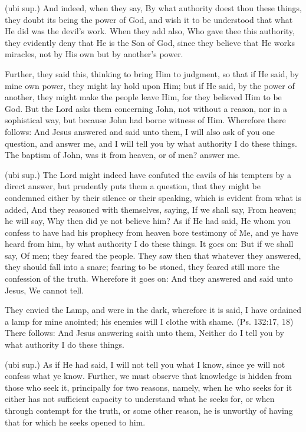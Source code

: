  (ubi sup.) And indeed, when they say, By what authority doest thou these things, they doubt its being the power of God, and wish it to be understood that what He did was the devil’s work. When they add also, Who gave thee this authority, they evidently deny that He is the Son of God, since they believe that He works miracles, not by His own but by another’s power.

 Further, they said this, thinking to bring Him to judgment, so that if He said, by mine own power, they might lay hold upon Him; but if He said, by the power of another, they might make the people leave Him, for they believed Him to be God. But the Lord asks them concerning John, not without a reason, nor in a sophistical way, but because John had borne witness of Him. Wherefore there follows: And Jesus answered and said unto them, I will also ask of you one question, and answer me, and I will tell you by what authority I do these things. The baptism of John, was it from heaven, or of men? answer me.

 (ubi sup.) The Lord might indeed have confuted the cavils of his tempters by a direct answer, but prudently puts them a question, that they might be condemned either by their silence or their speaking, which is evident from what is added, And they reasoned with themselves, saying, If we shall say, From heaven; he will say, Why then did ye not believe him? As if He had said, He whom you confess to have had his prophecy from heaven bore testimony of Me, and ye have heard from him, by what authority I do these things. It goes on: But if we shall say, Of men; they feared the people. They saw then that whatever they answered, they should fall into a snare; fearing to be stoned, they feared still more the confession of the truth. Wherefore it goes on: And they answered and said unto Jesus, We cannot tell.

 They envied the Lamp, and were in the dark, wherefore it is said, I have ordained a lamp for mine anointed; his enemies will I clothe with shame. (Ps. 132:17, 18) There follows: And Jesus answering saith unto them, Neither do I tell you by what authority I do these things.

 (ubi sup.) As if He had said, I will not tell you what I know, since ye will not confess what ye know. Further, we must observe that knowledge is hidden from those who seek it, principally for two reasons, namely, when he who seeks for it either has not sufficient capacity to understand what he seeks for, or when through contempt for the truth, or some other reason, he is unworthy of having that for which he seeks opened to him.

